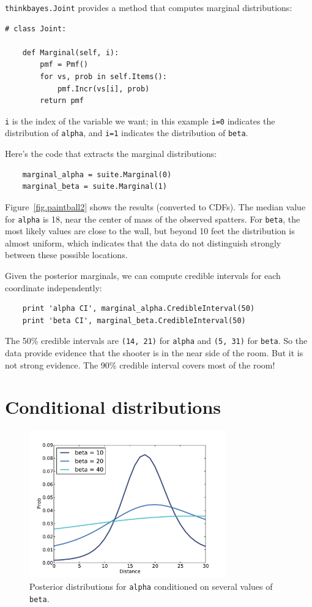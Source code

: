 \documentclass[12pt]{book}
\begin{document}
{\tt thinkbayes.Joint} provides a method that computes marginal
distributions:

\begin{verbatim}
# class Joint:

    def Marginal(self, i):
        pmf = Pmf()
        for vs, prob in self.Items():
            pmf.Incr(vs[i], prob)
        return pmf
\end{verbatim}

{\tt i} is the index of the variable we want; in this example
{\tt i=0} indicates the distribution of {\tt alpha}, and
{\tt i=1} indicates the distribution of {\tt beta}.

Here's the code that extracts the marginal distributions:

\begin{verbatim}
    marginal_alpha = suite.Marginal(0)
    marginal_beta = suite.Marginal(1)
\end{verbatim}

Figure~\ref{fig.paintball2} shows the results (converted to CDFs).
The median value for {\tt alpha} is 18, near the center of mass of
the observed spatters.  For {\tt beta}, the most likely values are
close to the wall, but beyond 10 feet the distribution is almost
uniform, which indicates that the data do not distinguish strongly
between these possible locations.

Given the posterior marginals, we can compute credible intervals
for each coordinate independently:

\begin{verbatim}
    print 'alpha CI', marginal_alpha.CredibleInterval(50)
    print 'beta CI', marginal_beta.CredibleInterval(50)
\end{verbatim}

The 50\% credible intervals are {\tt (14, 21)} for {\tt alpha} and
{\tt (5, 31)} for {\tt beta}.  So the data provide evidence that the
shooter is in the near side of the room.  But it is not strong
evidence.  The 90\% credible interval covers most of the room!


\section{Conditional distributions}

\begin{figure}
\centerline{\includegraphics[height=2.5in]{figs/paintball3.pdf}}
\caption{Posterior distributions for {\tt alpha} conditioned on several values
of {\tt beta}.}
\label{fig.paintball3}
\end{figure}
\end{document}
